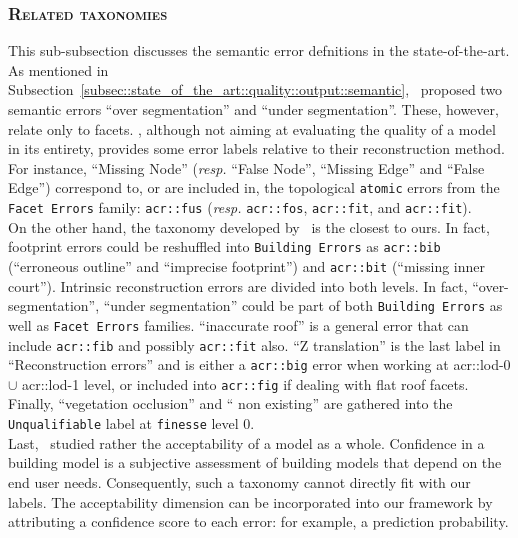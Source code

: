         \subsubsection{\textsc{Related taxonomies}}
            This sub-subsection discusses the semantic error defnitions in the state-of-the-art.
            As mentioned in Subsection~\ref{subsec::state_of_the_art::quality::output::semantic},~\textcite{rottensteiner2012isprs} proposed two semantic errors ``over segmentation'' and ``under segmentation''.
            These, however, relate only to facets.
            \textcite{xiong2014graph}, although not aiming at evaluating the quality of a model in its entirety, provides some error labels relative to their reconstruction method.
            For instance, ``Missing Node'' (\textit{resp.} ``False Node'', ``Missing Edge'' and ``False Edge'') correspond to, or are included in, the topological \texttt{atomic} errors from the \texttt{Facet Errors} family: \texttt{\gls{acr::fus}} (\textit{resp.} \texttt{\gls{acr::fos}}, \texttt{\gls{acr::fit}}, and \texttt{\gls{acr::fit}}).\\

            On the other hand, the taxonomy developed by~\textcite{michelin2013quality} is the closest to ours.
            In fact, footprint errors could be reshuffled into \texttt{Building Errors} as \texttt{\gls{acr::bib}} (``erroneous outline'' and ``imprecise footprint'') and \texttt{\gls{acr::bit}} (``missing inner court'').
            Intrinsic reconstruction errors are divided into both levels.
            In fact, ``over-segmentation'', ``under segmentation'' could be part of both \texttt{Building Errors} as well as \texttt{Facet Errors} families.
            ``inaccurate roof'' is a general error that can include \texttt{\gls{acr::fib}} and possibly \texttt{\gls{acr::fit}} also.
            ``Z translation'' is the last label in ``Reconstruction errors'' and is either a \texttt{\gls{acr::big}} error when working at \gls{acr::lod}-0 $\cup$ \gls{acr::lod}-1 level, or included into \texttt{\gls{acr::fig}} if dealing with flat roof facets.
            Finally, ``vegetation occlusion'' and `` non existing'' are gathered into the \texttt{Unqualifiable} label at \texttt{finesse} level 0.\\

            Last,~\textcite{boudet2006supervised} studied rather the acceptability of a model as a whole.
            Confidence in a building model is a subjective assessment of building models that depend on the end user needs.
            Consequently, such a taxonomy cannot directly fit with our labels.
            The acceptability dimension can be incorporated into our framework by attributing a confidence score to each error: for example, a prediction probability.        

